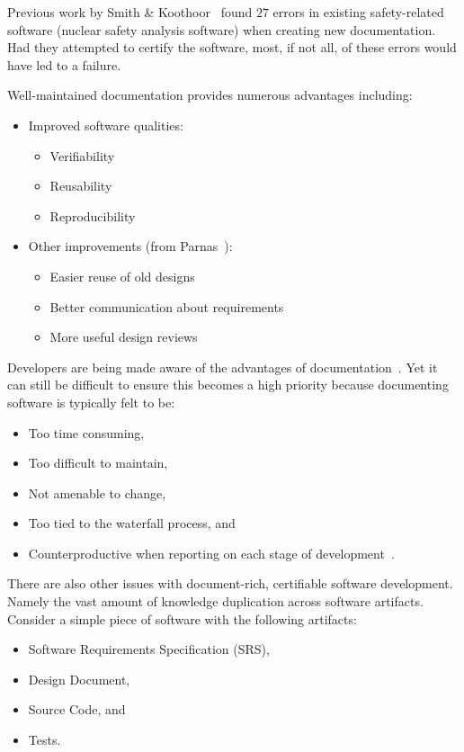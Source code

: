 \documentclass[sigconf]{acmart}
\begin{document}
Previous work by Smith \& Koothoor~\citep{SmithAndKoothoor2016} found $27$ errors
in existing safety-related software (nuclear safety analysis software) when
creating new documentation. Had they attempted to certify the software, most, if
not all, of these errors would have led to a failure.

Well-maintained documentation provides numerous advantages including:
\begin{itemize}
\item Improved software qualities:
    \begin{itemize}
    \item Verifiability
    \item Reusability
    \item Reproducibility
    \end{itemize}

\item Other improvements (from Parnas~\cite{Parnas2010}):
    \begin{itemize}
        \item Easier reuse of old designs
        \item Better communication about requirements
        \item More useful design reviews
    \end{itemize}
\end{itemize}

Developers are being made aware of the advantages of 
documentation~\cite{SmithJegatheesanAndKelly2016}. Yet it can still be difficult 
to ensure this becomes a high priority because documenting software is typically 
felt to be:

\begin{itemize}
\item Too time consuming,
\item Too difficult to maintain,
\item Not amenable to change,
\item Too tied to the waterfall process, and
\item Counterproductive when reporting on each stage of 
        development~\cite{Roache1998}.
\end{itemize}

There are also other issues with document-rich, certifiable software 
development. Namely the vast amount of knowledge duplication across software 
artifacts. Consider a simple piece of software with the following artifacts:

\begin{itemize}
\item Software Requirements Specification (SRS),
\item Design Document,
\item Source Code, and
\item Tests.
\end{itemize}
\end{document}
